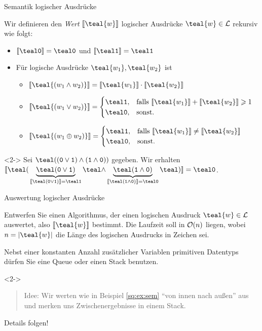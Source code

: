 \begin{frame}{Semantik logischer Ausdr\"ucke}
\begin{definition}
Wir definieren den \emph{Wert} $\llbracket \teal{w} \rrbracket$ logischer Ausdr\"ucke $\teal{w} \in \mathcal{L}$ rekursiv wie folgt:
\begin{itemize}
    \item $\eval{\logic{0}} = \logic{0}$ und $\eval{\logic{1}} = \logic{1}$
    \item F\"ur logische Ausdr\"ucke $\teal{w_1}, \teal{w_2}$ ist
    \begin{itemize}
        \item $\eval{\teal{(w_1 \land w_2)}} = \eval{\teal{w_1}} \cdot \eval{\teal{w_2}}$
        \item $\eval{\teal{(w_1 \lor w_2)}} = \begin{cases}\logic{1}, & \text{falls } \eval{\teal{w_1}} + \eval{\teal{w_2}} \geq 1 \\ \logic{0}, & \text{sonst.}\end{cases}$
        \item $\eval{\teal{(w_1 \oplus w_2)}} = \begin{cases}\logic{1}, & \text{falls } \eval{\teal{w_1}} \neq \eval{\teal{w_2}} \\ \logic{0}, & \text{sonst.}\end{cases}$
    \end{itemize}
\end{itemize}
\end{definition}
\begin{example}<2->\label{sq:ex:sem}\vspace*{-6pt}
Sei $\logic{((0 \lor 1) \land (1 \land 0))}$ gegeben.
Wir erhalten $\eval{
\logic{(}
\underbrace{\logic{(0 \lor 1)}}_{\eval{\logic{(0 \lor 1)}} = \logic{1}}
\logic{\land}
\underbrace{\logic{(1 \land 0)}}_{\eval{\logic{(1 \land 0)}} = \logic{0}}
\logic{)}
} = \logic{0}$.
\end{example}
\end{frame}

\begin{frame}{Auswertung logischer Ausdr\"ucke}
\begin{task}
Entwerfen Sie einen Algorithmus, der einen logischen Ausdruck $\teal{w} \in \mathcal{L}$ auswertet, also $\eval{\teal{w}}$ bestimmt.
Die Laufzeit soll in $\mathcal{O}(n)$ liegen, wobei $n = |\teal{w}|$ die L\"ange des logischen Ausdrucks in Zeichen sei.

Nebst einer konstanten Anzahl zus\"atzlicher Variablen primitiven Datentyps d\"urfen Sie eine Queue oder einen Stack benutzen.
\end{task}
\begin{solution}<2->
\begin{quote}
    Idee: Wir werten  wie in Beispiel \ref{sq:ex:sem} ``von innen nach au{\ss}en'' aus und merken uns Zwischenergebnisse in einem \alert{Stack}.
\end{quote}

Details folgen!
\end{solution}
\end{frame}